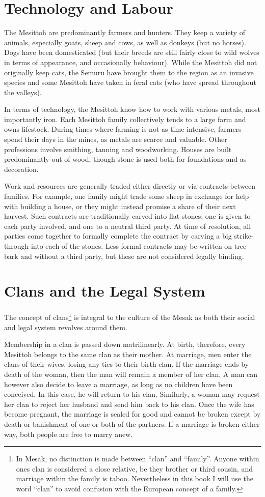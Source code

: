 \documentclass[paper=6in:9in, fontsize=10.5]{scrbook}
\newcommand{\en}[1]{``#1''}
\newcommand{\ý}{ɨ́}
\begin{document}
\section{Technology and Labour}
The Mesittoh are predominantly farmers and hunters. They keep a variety of animals, especially goats, sheep and cows, as well as donkeys (but no horses). Dogs have been domesticated (but their breeds are still fairly close to wild wolves in terms of appearance, and occasionally behaviour). While the Mesittoh did not originally keep cats, the Semuru have brought them to the region as an invasive species and some Mesittoh have taken in feral cats (who have spread throughout the valleys). 

In terms of technology, the Mesittoh know how to work with various metals, most importantly iron. Each Mesittoh family collectively tends to a large farm and owns lifestock. During times where farming is not as time-intensive, farmers spend their days in the mines, as metals are scarce and valuable. Other professions involve smithing, tanning and woodworking. Houses are built predominantly out of wood, though stone is used both for foundations and as decoration.

Work and resources are generally traded either directly or via contracts between families. For example, one family might trade some sheep in exchange for help with building a house, or they might instead promise a share of their next harvest. Such contracts are traditionally carved into flat stones: one is given to each party involved, and one to a neutral third party. At time of resolution, all parties come together to formally complete the contract by carving a big strike-through into each of the stones. Less formal contracts may be written on tree bark and without a third party, but these are not considered legally binding.

\section{Clans and the Legal System}
The concept of clans\footnote{In Mesak, no distinction is made between \en{clan} and \en{family}. Anyone within ones clan is considered a close relative, be they brother or third cousin, and marriage within the family is taboo. Nevertheless in this book I will use the word \en{clan} to avoid confusion with the European concept of a family.} is integral to the culture of the Mesak as both their social and legal system revolves around them.

Membership in a clan is passed down matrilinearly. At birth, therefore, every Mesittoh belongs to the same clan as their mother. At marriage, men enter the clans of their wives, losing any ties to their birth clan. If the marriage ends by death of the woman, then the man will remain a member of her clan. A man can however also decide to leave a marriage, as long as no children have been conceived. In this case, he will return to his clan. Similarly, a woman may request her clan to reject her husband and send him back to his clan. Once the wife has become pregnant, the marriage is sealed for good and cannot be broken except by death or banishment of one or both of the partners. If a marriage is broken either way, both people are free to marry anew.
\end{document}
